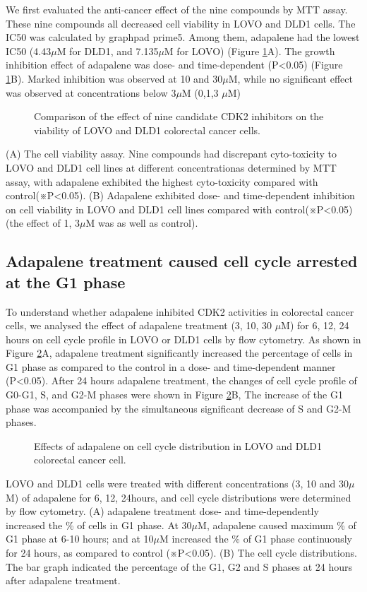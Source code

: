 We first evaluated the anti-cancer effect of the nine compounds by MTT assay. These nine compounds all decreased cell viability in LOVO and DLD1 cells. The IC50 was calculated by graphpad prime5. Among them, adapalene had the lowest IC50 (4.43$\mu$M for DLD1, and 7.135$\mu$M for LOVO) (Figure \ref{cdk2:MTT}A). The growth inhibition effect of adapalene was dose- and time-dependent (P<0.05) (Figure \ref{cdk2:MTT}B). Marked inhibition was observed at 10 and 30$\mu$M, while no significant effect was observed at concentrations below 3$\mu$M (0,1,3 $\mu$M)

\begin{figure}
\centering
\caption{Comparison of the effect of nine candidate CDK2 inhibitors on the viability of LOVO and DLD1 colorectal cancer cells.}
\label{cdk2:MTT}
\end{figure}
(A) The cell viability assay. Nine compounds had discrepant cyto-toxicity to LOVO and DLD1 cell lines at different concentrationas determined by MTT assay, with adapalene exhibited the highest cyto-toxicity compared with control(※P<0.05). (B) Adapalene exhibited dose- and time-dependent inhibition on cell viability in LOVO and DLD1 cell lines compared with control(※P<0.05)(the effect of 1, 3$\mu$M was as well as control).

\subsection{Adapalene treatment caused cell cycle arrested at the G1 phase}

To understand whether adapalene inhibited CDK2 activities in colorectal cancer cells, we analysed the effect of adapalene treatment (3, 10, 30 $\mu$M) for 6, 12, 24 hours on cell cycle profile in LOVO or DLD1 cells by flow cytometry. As shown in Figure \ref{cdk2:CellCycleDistribution}A, adapalene treatment significantly increased the percentage of cells in G1 phase as compared to the control in a dose- and time-dependent manner (P<0.05). After 24 hours adapalene treatment, the changes of cell cycle profile of G0-G1, S, and G2-M phases were shown in Figure \ref{cdk2:CellCycleDistribution}B, The increase of the G1 phase was accompanied by the simultaneous significant decrease of S and G2-M phases.

\begin{figure}
\centering
\caption{Effects of adapalene on cell cycle distribution in LOVO and DLD1 colorectal cancer cell.}
\label{cdk2:CellCycleDistribution}
\end{figure}
LOVO and DLD1 cells were treated with different concentrations (3, 10 and 30$\mu$M) of adapalene for 6, 12, 24hours, and cell cycle distributions were determined by flow cytometry. (A) adapalene treatment dose- and time-dependently increased the \% of cells in G1 phase. At 30$\mu$M, adapalene caused maximum \% of G1 phase at 6-10 hours; and at 10$\mu$M increased the \% of G1 phase continuously for 24 hours, as compared to control (※P<0.05). (B) The cell cycle distributions. The bar graph indicated the percentage of the G1, G2 and S phases at 24 hours after adapalene treatment.

